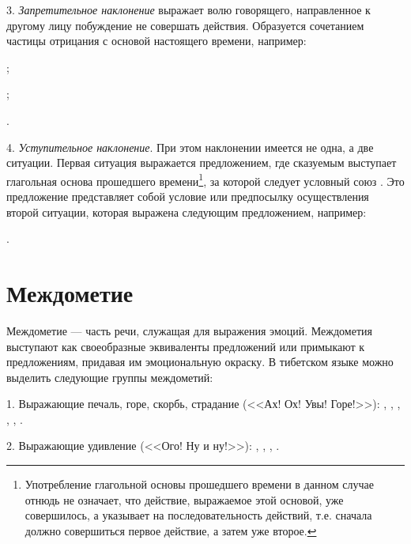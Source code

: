 3. \emph{Запретительное наклонение} выражает волю говорящего, направленное к другому лицу побуждение не совершать действия. Образуется сочетанием частицы отрицания с основой настоящего времени, например:
\begin{prfsample}
	\item {};
	\item {};
	\item {}.
\end{prfsample}

4. \emph{Уступительное наклонение}. При этом наклонении имеется не одна, а две ситуации. Первая ситуация выражается предложением, где сказуемым выступает глагольная основа прошедшего времени\footnote[39]{Употребление глагольной основы прошедшего времени в данном случае отнюдь не означает, что действие, выражаемое этой основой, уже совершилось, а указывает на последовательность действий, т.е. сначала должно совершиться первое действие, а затем уже второе.}, за которой следует условный союз . Это предложение представляет собой условие или предпосылку осуществления второй ситуации, которая выражена следующим предложением, например:
\begin{prfsample}
	\item {}.
\end{prfsample}

\section{Междометие}

Междометие --- часть речи, служащая для выражения эмоций. Междометия выступают как своеобразные эквиваленты предложений или примыкают к предложениям, придавая им эмоциональную окраску. В тибетском языке можно выделить следующие группы междометий:

1. Выражающие печаль, горе, скорбь, страдание (<<Ах! Ох! Увы! Горе!>>):
,
,
,
,
,
.

2. Выражающие удивление (<<Ого! Ну и ну!>>):
,
,
,
.

